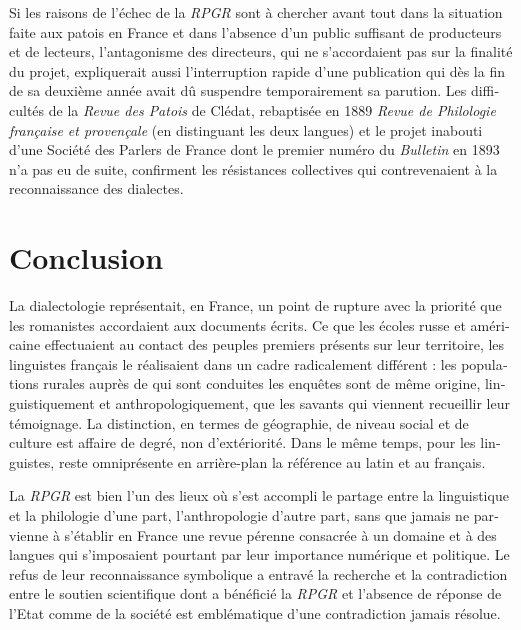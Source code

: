 \documentclass[french,output=paper,colorlinks,citecolor=brown]{../langscibook}
\begin{document}
\begin{otherlanguage}{french}
Si les raisons de l’échec de la \textit{RPGR} sont à chercher avant tout dans la situation faite aux patois en France et dans l’absence d’un public suffisant de producteurs et de lecteurs, l’antagonisme des directeurs, qui ne s’accordaient pas sur la finalité du projet, expliquerait aussi l’interruption rapide d’une publication qui dès la fin de sa deuxième année avait dû suspendre temporairement sa parution. Les difficultés de la \textit{Revue des Patois} de Clédat, rebaptisée en 1889 \textit{Revue de Philologie française et provençale} (en distinguant les deux langues) et le projet inabouti d’une Société des Parlers de France dont le premier numéro du \textit{Bulletin} en 1893 n’a pas eu de suite, confirment les résistances collectives qui contrevenaient à la reconnaissance des dialectes. 

\section{Conclusion} 

La dialectologie représentait, en France, un point de rupture avec la priorité que les romanistes accordaient aux documents écrits. Ce que les écoles russe et américaine effectuaient au contact des peuples premiers présents sur leur territoire, les linguistes français le réalisaient dans un cadre radicalement différent : les populations rurales auprès de qui sont conduites les enquêtes sont de même origine, linguistiquement et anthropologiquement, que les savants qui viennent recueillir leur témoignage. La distinction, en termes de géographie, de niveau social et de culture est affaire de degré, non d’extériorité. Dans le même temps, pour les linguistes, reste omniprésente en arrière-plan la référence au latin et au français.

La \textit{RPGR} est bien l’un des lieux où s’est accompli le partage entre la linguistique et la philologie d’une part, l’anthropologie d’autre part, sans que jamais ne parvienne à s’établir en France une revue pérenne consacrée à un domaine et à des langues qui s’imposaient pourtant par leur importance numérique et politique. Le refus de leur reconnaissance symbolique a entravé la recherche et la contradiction entre le soutien scientifique dont a bénéficié la \textit{RPGR} et l’absence de réponse de l’Etat comme de la société est emblématique d’une contradiction jamais résolue.





{\sloppy\printbibliography[heading=subbibliography,notkeyword=this]}
\end{otherlanguage}
\end{document}
